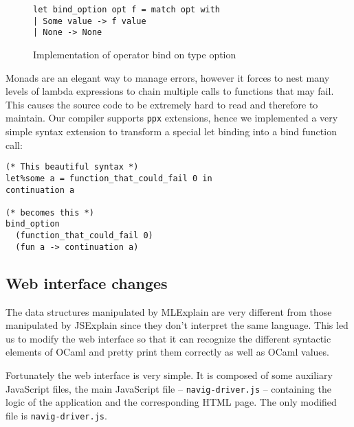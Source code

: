 \documentclass[twocolumn]{article}
\begin{document}
\begin{figure}[hb]
  \begin{verbatim}
let bind_option opt f = match opt with
| Some value -> f value
| None -> None
  \end{verbatim}
  
  \label{fig:error}
  \caption{Implementation of operator bind on type option}
\end{figure}

Monads are an elegant way to manage errors, however it forces to nest many
levels of lambda expressions to chain multiple calls to functions that may
fail. This causes the source code to be extremely hard to read and therefore to
maintain. Our compiler supports \texttt{ppx} extensions, hence we implemented a
very simple syntax extension to transform a special let binding into a bind
function call:

\begin{verbatim}
(* This beautiful syntax *)
let%some a = function_that_could_fail 0 in
continuation a

(* becomes this *)
bind_option
  (function_that_could_fail 0)
  (fun a -> continuation a)
\end{verbatim}

\subsection{Web interface changes}

The data structures manipulated by MLExplain are very different from those
manipulated by JSExplain since they don't interpret the same language. This led
us to modify the web interface so that it can recognize the different syntactic
elements of OCaml and pretty print them correctly as well as OCaml values.

Fortunately the web interface is very simple. It is composed of some auxiliary
JavaScript files, the main JavaScript file -- \texttt{navig-driver.js} --
containing the logic of the application and the corresponding HTML page. The
only modified file is \texttt{navig-driver.js}.



\end{document}

